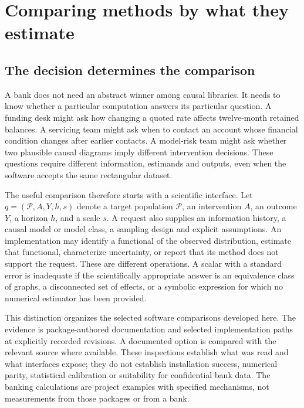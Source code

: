 \chapter{Comparing methods by what they estimate}
\label{sw:interfaces}

\section{The decision determines the comparison}

A bank does not need an abstract winner among causal libraries. It needs to
know whether a particular computation answers its particular question. A
funding desk might ask how changing a quoted rate affects twelve-month retained
balances. A servicing team might ask when to contact an account whose financial
condition changes after earlier contacts. A model-risk team might ask whether
two plausible causal diagrams imply different intervention decisions. These
questions require different information, estimands and outputs, even when the
software accepts the same rectangular dataset.

The useful comparison therefore starts with a scientific interface. Let
\(q=(\mathcal P,A,Y,h,s)\) denote a target population \(\mathcal P\), an intervention
\(A\), an outcome \(Y\), a horizon \(h\), and a scale \(s\). A request also supplies
an information history, a causal model or model class, a sampling design and
explicit assumptions. An implementation may identify a functional of the
observed distribution, estimate that functional, characterize uncertainty, or
report that its method does not support the request. These are different
operations. A scalar with a standard error is inadequate if the scientifically
appropriate answer is an equivalence class of graphs, a disconnected set of
effects, or a symbolic expression for which no numerical estimator has been
provided.

This distinction organizes the selected software comparisons developed here.
The evidence is package-authored documentation and selected implementation
paths at explicitly recorded revisions. A documented option is compared with
the relevant source where available. These inspections establish what was
read and what interfaces expose; they do not establish installation success,
numerical parity, statistical calibration or suitability for confidential bank
data. The banking calculations are project examples with specified mechanisms,
not measurements from those packages or from a bank.

